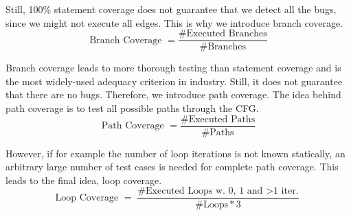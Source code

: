 Still, 100\% statement coverage does not guarantee that we detect all the bugs, since we might not execute all edges. This is why we introduce branch coverage.
$$\text{Branch Coverage } = \frac{\text{\#Executed Branches}}{\text{\#Branches}}$$

Branch coverage leads to more thorough testing than statement coverage and is the most widely-used adequacy criterion in industry. Still, it does not guarantee that there are no bugs. Therefore, we introduce path coverage. The idea behind path coverage is to test all possible paths through the CFG.
$$\text{Path Coverage } = \frac{\text{\#Executed Paths}}{\text{\#Paths}}$$

However, if for example the number of loop iterations is not known statically, an arbitrary large number of test cases is needed for complete path coverage. This leads to the final idea, loop coverage.
$$\text{Loop Coverage } = \frac{\text{\#Executed Loops w. 0, 1 and $>$1 iter.}}{\text{\#Loops} * 3}$$